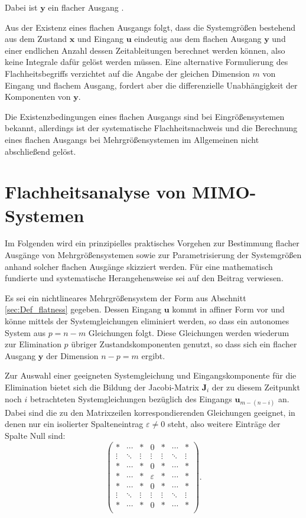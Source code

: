 Dabei ist $\mathbf{y}$ ein flacher Ausgang \cite[S. 185]{NLRT_Roebenack}. 

Aus der Existenz eines flachen Ausgangs folgt, dass die Systemgrößen bestehend aus dem Zustand $\mathbf{x}$ und Eingang $\mathbf{u}$ eindeutig aus dem flachen Ausgang $\mathbf{y}$ und einer endlichen Anzahl dessen Zeitableitungen berechnet werden können, also keine Integrale dafür gelöst werden müssen. Eine alternative Formulierung des Flachheitsbegriffs verzichtet auf die Angabe der gleichen Dimension $m$ von Eingang und flachem Ausgang, fordert aber die differenzielle Unabhängigkeit der Komponenten von $\mathbf{y}$.

Die Existenzbedingungen eines ﬂachen Ausgangs sind bei Eingrößensystemen bekannt, allerdings ist der systematische Flachheitsnachweis und die Berechnung eines
ﬂachen Ausgangs bei Mehrgrößensystemen im Allgemeinen nicht abschließend gelöst.

\section{Flachheitsanalyse von MIMO-Systemen}

Im Folgenden wird ein prinzipielles praktisches Vorgehen zur Bestimmung flacher Ausgänge von Mehrgrößensystemen sowie zur Parametrisierung der Systemgrößen anhand solcher flachen Ausgänge skizziert werden. Für eine mathematisch fundierte und systematische Herangehensweise sei auf den Beitrag \cite{Fritzsche2016} verwiesen.

Es sei ein nichtlineares Mehrgrößensystem der Form aus Abschnitt \ref{sec:Def_flatness} gegeben. Dessen Eingang $\mathbf{u}$ kommt in affiner Form vor und könne mittels der Systemgleichungen eliminiert werden, so dass ein autonomes System aus $p = n - m$ Gleichungen folgt. Diese Gleichungen werden wiederum zur Elimination $p$ übriger Zustandskomponenten genutzt, so dass sich ein flacher Ausgang $\mathbf{y}$ der Dimension $n - p = m$ ergibt. 

Zur Auswahl einer geeigneten Systemgleichung und Eingangskomponente für die Elimination bietet sich die Bildung der Jacobi-Matrix $\mathbf{J}_i$ der zu diesem Zeitpunkt noch $i$ betrachteten Systemgleichungen bezüglich des Eingangs $\mathbf{u}_{m-(n-i)}$ an. Dabei sind die zu den Matrixzeilen korrespondierenden Gleichungen geeignet, in denen nur ein isolierter Spalteneintrag $\varepsilon \neq 0$ steht, also weitere Einträge der Spalte Null sind:
\begin{equation}
	\begin{pmatrix}
	* & \cdots & * & 0 & * & \cdots & *\\
	\vdots & \ddots & \vdots & \vdots & \vdots & \ddots & \vdots \\
	* & \cdots & * & 0 & * & \cdots & *  \\
	* & \cdots & * & \varepsilon & * & \cdots & * \\
	* & \cdots & * & 0 & * & \cdots & *  \\
	\vdots & \ddots & \vdots & \vdots & \vdots & \ddots & \vdots \\
	* & \cdots & * & 0 & * & \cdots & *\\
	\end{pmatrix}.
\end{equation}

